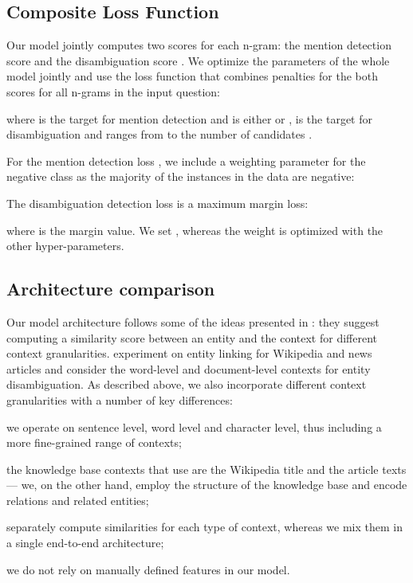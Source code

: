 \documentclass[11pt,a4paper]{article}
\begin{document}
\subsection{Composite Loss Function}
\label{sec:loss}

Our model jointly computes two scores for each n-gram: the mention detection score  and the disambiguation score . We optimize the parameters of the whole model jointly and use the loss function that combines penalties for the both scores for all n-grams in the input question:

where  is the target for mention detection and is either  or ,  is the target for disambiguation and ranges from  to the number of candidates . 

For the mention detection loss , we include a weighting parameter  for the negative class as the majority of the instances in the data are negative:


The disambiguation detection loss  is a maximum margin loss:

where  is the margin value. We set , whereas the  weight is optimized with the other hyper-parameters.

\subsection{Architecture comparison} 

Our model architecture follows some of the ideas presented in \citet{Francis-Landau2016}: they suggest computing a similarity score between an entity and the context for different context granularities. \citet{Francis-Landau2016} experiment on entity linking for Wikipedia and news articles and consider the word-level and document-level contexts for entity disambiguation. As described above, we also incorporate different context granularities with a number of key differences: 
\begin{enumerate*}[label=(\arabic*)]
  \item we operate on sentence level, word level and character level, thus including a more fine-grained range of contexts;
  \item the knowledge base contexts that \citet{Francis-Landau2016} use are the Wikipedia title and the article texts --- we, on the other hand, employ the structure of the knowledge base and encode relations and related entities;
  \item \citet{Francis-Landau2016} separately compute similarities for each type of context, whereas we mix them in a single end-to-end architecture;
  \item we do not rely on manually defined features in our model.
\end{enumerate*}
\end{document}
